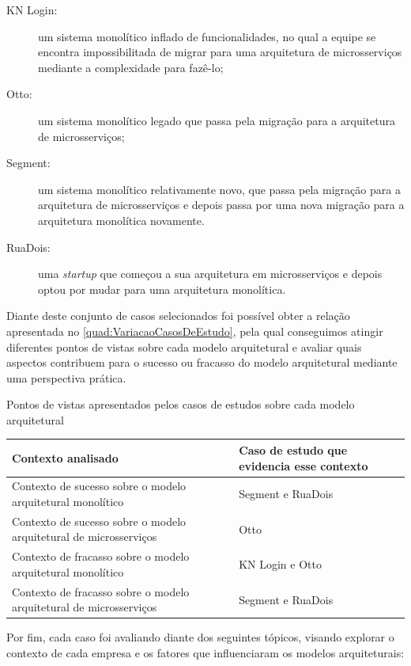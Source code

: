 \begin{description}
    \item[KN Login:] um sistema monolítico inflado de funcionalidades, no qual a equipe se encontra
        impossibilitada de migrar para uma arquitetura de microsserviços mediante a complexidade
        para fazê-lo;
    \item[Otto:] um sistema monolítico legado que passa pela migração para a arquitetura de
        microsserviços;
    \item[Segment:] um sistema monolítico relativamente novo, que passa pela migração para a
        arquitetura de microsserviços e depois passa por uma nova migração para a arquitetura
        monolítica novamente.
    \item[RuaDois:] uma \textit{startup} que começou a sua arquitetura em microsserviços e depois
        optou por mudar para uma arquitetura monolítica.
\end{description}

Diante deste conjunto de casos selecionados foi possível obter a relação apresentada no
\autoref{quad:VariacaoCasosDeEstudo}, pela qual conseguimos atingir diferentes pontos de vistas sobre
cada modelo arquitetural e avaliar quais aspectos contribuem para o sucesso ou fracasso do modelo
arquitetural mediante uma perspectiva prática.

\begin{quadro}
    \caption{Pontos de vistas apresentados pelos casos de estudos sobre cada modelo
    arquitetural\label{quad:VariacaoCasosDeEstudo}}
    \begin{tabularx}{\linewidth}{ | X | p{6cm} | }
    \hline
        \textbf{Contexto analisado} & \textbf{Caso de estudo que evidencia esse contexto}\\ \hline
    Contexto de sucesso sobre o modelo arquitetural monolítico & Segment e RuaDois\\ \hline
    Contexto de sucesso sobre o modelo arquitetural de microsserviços & Otto \\ \hline
    Contexto de fracasso sobre o modelo arquitetural monolítico & KN Login e Otto \\ \hline
    Contexto de fracasso sobre o modelo arquitetural de microsserviços & Segment e RuaDois \\ \hline
    \end{tabularx}
\end{quadro}

Por fim, cada caso foi avaliando diante dos seguintes tópicos, visando explorar o contexto de cada
empresa e os fatores que influenciaram os modelos arquiteturais:

